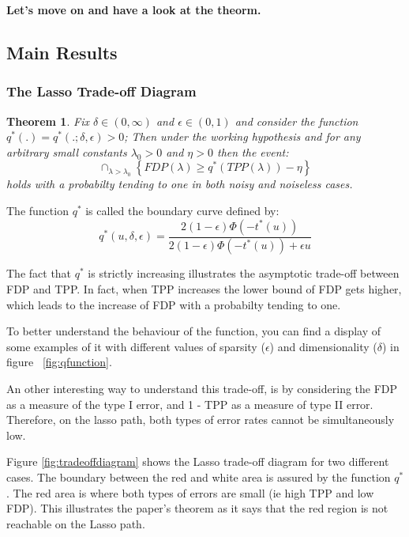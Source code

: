 \documentclass[10pt,onecolumn,letterpaper]{article}
\newtheorem{theorem}{Theorem}
\begin{document}
\textbf{Let's move on and have a look at the theorm.}


\subsection{Main Results}

\subsubsection{The Lasso Trade-off Diagram}


\begin{theorem}
Fix $\delta \in \left (0,\infty \right )$ and $ \epsilon \in \left (0,1 \right) $  and consider the function $ q^*(.) = q^*(.;\delta, \epsilon ) > 0 $; Then under the working hypothesis and for any arbitrary small constants $ \lambda_0 > 0$ and $\eta > 0$ then the event:
$$ \cap_{\lambda > \lambda_0} \left\{FDP(\lambda ) \geq q^* \left( TPP(\lambda)\right) - \eta \right\}
$$
 holds with a probabilty tending to one in both noisy and noiseless cases. 
\end{theorem}


 The function $q^*$ is called the boundary curve defined by:
 $$
q^*\left(u,\delta,\epsilon\right) = \frac{2(1-\epsilon)\Phi(-t^*(u))}{2(1-\epsilon)\Phi(-t^*(u)) + \epsilon u}
 $$

The fact that $q^*$ is strictly increasing illustrates the asymptotic trade-off between FDP and TPP. In fact, when TPP increases the lower bound of FDP gets higher, which leads to the increase of FDP with a probabilty tending to one. 
\newline

To better understand the behaviour of the function, you can find a display of some examples of it with different values of sparsity ($\epsilon$) and dimensionality ($\delta$) in figure ~\ref{fig:qfunction}.
\newline

An other interesting way to understand this trade-off, is by considering the FDP as a measure of the type I error, and 1 - TPP as a measure of type II error. Therefore, on the lasso path, both types of error rates cannot be simultaneously low. 
\newline

Figure \ref{fig:tradeoffdiagram} shows the Lasso trade-off diagram for two different cases. The boundary between the red and white area is assured by the function $q^*$. The red area is where both types of errors are small (ie high TPP and low FDP). This illustrates the paper's theorem as it says that the red region is not reachable on the Lasso path.
\newline
\end{document}

